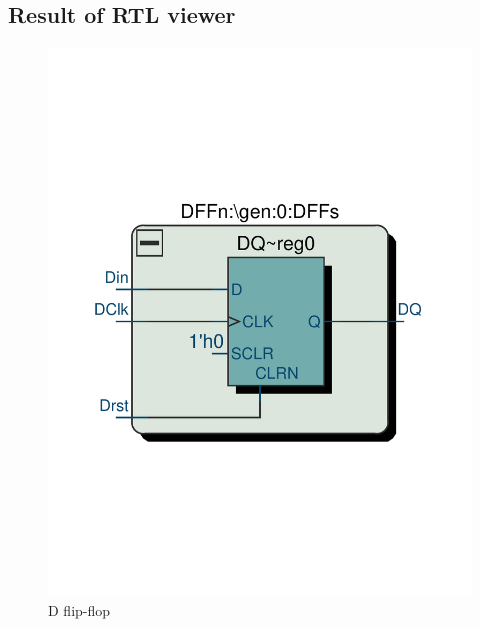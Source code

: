 \documentclass[13pt,a4paper]{report}
\begin{document}
\subsection{Result of RTL viewer}


\begin{figure}[H]
\centering
\includegraphics[scale=0.4, clip, trim={2cm 8cm 2cm 9.1cm}]{images/Exc1_DFF_RTL.pdf}
\caption*{D flip-flop}
\end{figure}
\end{document}
